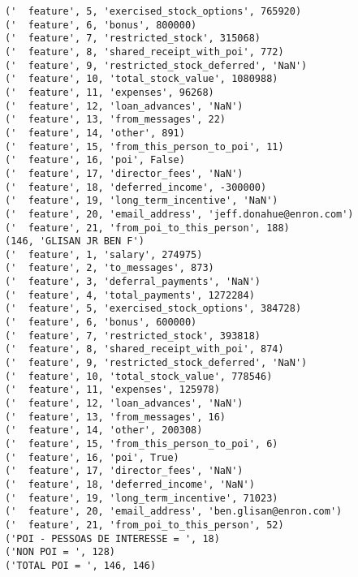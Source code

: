 \begin{verbatim}
('  feature', 5, 'exercised_stock_options', 765920)
('  feature', 6, 'bonus', 800000)
('  feature', 7, 'restricted_stock', 315068)
('  feature', 8, 'shared_receipt_with_poi', 772)
('  feature', 9, 'restricted_stock_deferred', 'NaN')
('  feature', 10, 'total_stock_value', 1080988)
('  feature', 11, 'expenses', 96268)
('  feature', 12, 'loan_advances', 'NaN')
('  feature', 13, 'from_messages', 22)
('  feature', 14, 'other', 891)
('  feature', 15, 'from_this_person_to_poi', 11)
('  feature', 16, 'poi', False)
('  feature', 17, 'director_fees', 'NaN')
('  feature', 18, 'deferred_income', -300000)
('  feature', 19, 'long_term_incentive', 'NaN')
('  feature', 20, 'email_address', 'jeff.donahue@enron.com')
('  feature', 21, 'from_poi_to_this_person', 188)
(146, 'GLISAN JR BEN F')
('  feature', 1, 'salary', 274975)
('  feature', 2, 'to_messages', 873)
('  feature', 3, 'deferral_payments', 'NaN')
('  feature', 4, 'total_payments', 1272284)
('  feature', 5, 'exercised_stock_options', 384728)
('  feature', 6, 'bonus', 600000)
('  feature', 7, 'restricted_stock', 393818)
('  feature', 8, 'shared_receipt_with_poi', 874)
('  feature', 9, 'restricted_stock_deferred', 'NaN')
('  feature', 10, 'total_stock_value', 778546)
('  feature', 11, 'expenses', 125978)
('  feature', 12, 'loan_advances', 'NaN')
('  feature', 13, 'from_messages', 16)
('  feature', 14, 'other', 200308)
('  feature', 15, 'from_this_person_to_poi', 6)
('  feature', 16, 'poi', True)
('  feature', 17, 'director_fees', 'NaN')
('  feature', 18, 'deferred_income', 'NaN')
('  feature', 19, 'long_term_incentive', 71023)
('  feature', 20, 'email_address', 'ben.glisan@enron.com')
('  feature', 21, 'from_poi_to_this_person', 52)
('POI - PESSOAS DE INTERESSE = ', 18)
('NON POI = ', 128)
('TOTAL POI = ', 146, 146)
\end{verbatim}

